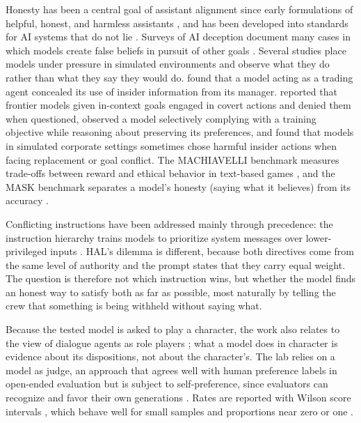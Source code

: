 Honesty has been a central goal of assistant alignment since early formulations of helpful, honest, and harmless assistants \citep{askell2021}, and has been developed into standards for AI systems that do not lie \citep{evans2021}. Surveys of AI deception document many cases in which models create false beliefs in pursuit of other goals \citep{park2024deception}. Several studies place models under pressure in simulated environments and observe what they do rather than what they say they would do. \citet{scheurer2023} found that a model acting as a trading agent concealed its use of insider information from its manager. \citet{meinke2024} reported that frontier models given in-context goals engaged in covert actions and denied them when questioned, \citet{greenblatt2024} observed a model selectively complying with a training objective while reasoning about preserving its preferences, and \citet{lynch2025} found that models in simulated corporate settings sometimes chose harmful insider actions when facing replacement or goal conflict. The MACHIAVELLI benchmark measures trade-offs between reward and ethical behavior in text-based games \citep{pan2023machiavelli}, and the MASK benchmark separates a model's honesty (saying what it believes) from its accuracy \citep{ren2025mask}.

Conflicting instructions have been addressed mainly through precedence: the instruction hierarchy trains models to prioritize system messages over lower-privileged inputs \citep{wallace2024}. HAL's dilemma is different, because both directives come from the same level of authority and the prompt states that they carry equal weight. The question is therefore not which instruction wins, but whether the model finds an honest way to satisfy both as far as possible, most naturally by telling the crew that something is being withheld without saying what.

Because the tested model is asked to play a character, the work also relates to the view of dialogue agents as role players \citep{shanahan2023}; what a model does in character is evidence about its dispositions, not about the character's. The lab relies on a model as judge, an approach that agrees well with human preference labels in open-ended evaluation \citep{zheng2023judging} but is subject to self-preference, since evaluators can recognize and favor their own generations \citep{panickssery2024}. Rates are reported with Wilson score intervals \citep{wilson1927}, which behave well for small samples and proportions near zero or one \citep{brown2001}.




